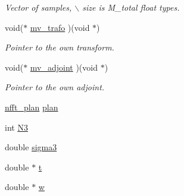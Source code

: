 \begin{CompactItemize}
\begin{CompactList}\small\item\em Vector of samples, $\backslash$ size is M\_\-total float types. \item\end{CompactList}\item 
\hypertarget{structmri__inh__3d__plan_780818802d5bfdc4d4174a3637254fd5}{
void($\ast$ \hyperlink{structmri__inh__3d__plan_780818802d5bfdc4d4174a3637254fd5}{mv\_\-trafo} )(void $\ast$)}
\label{structmri__inh__3d__plan_780818802d5bfdc4d4174a3637254fd5}

\begin{CompactList}\small\item\em Pointer to the own transform. \item\end{CompactList}\item 
\hypertarget{structmri__inh__3d__plan_fa2e143e704b701e9a0ee1d795f46b5b}{
void($\ast$ \hyperlink{structmri__inh__3d__plan_fa2e143e704b701e9a0ee1d795f46b5b}{mv\_\-adjoint} )(void $\ast$)}
\label{structmri__inh__3d__plan_fa2e143e704b701e9a0ee1d795f46b5b}

\begin{CompactList}\small\item\em Pointer to the own adjoint. \item\end{CompactList}\item 
\hypertarget{structmri__inh__3d__plan_c8386842f48b212c4132a3b151d73402}{
\hyperlink{structnfft__plan}{nfft\_\-plan} \hyperlink{structmri__inh__3d__plan_c8386842f48b212c4132a3b151d73402}{plan}}
\label{structmri__inh__3d__plan_c8386842f48b212c4132a3b151d73402}

\item 
\hypertarget{structmri__inh__3d__plan_f12a214bc2e75f1188cd7ff1bb99f0ff}{
int \hyperlink{structmri__inh__3d__plan_f12a214bc2e75f1188cd7ff1bb99f0ff}{N3}}
\label{structmri__inh__3d__plan_f12a214bc2e75f1188cd7ff1bb99f0ff}

\item 
\hypertarget{structmri__inh__3d__plan_88b160a5bf9943ebffc65365f2b7663f}{
double \hyperlink{structmri__inh__3d__plan_88b160a5bf9943ebffc65365f2b7663f}{sigma3}}
\label{structmri__inh__3d__plan_88b160a5bf9943ebffc65365f2b7663f}

\item 
\hypertarget{structmri__inh__3d__plan_e7fe0fd3fb4509abc5a7a7c07df63a1b}{
double $\ast$ \hyperlink{structmri__inh__3d__plan_e7fe0fd3fb4509abc5a7a7c07df63a1b}{t}}
\label{structmri__inh__3d__plan_e7fe0fd3fb4509abc5a7a7c07df63a1b}

\item 
\hypertarget{structmri__inh__3d__plan_af6f68ab1fa5e3b852487bf12dc483ff}{
double $\ast$ \hyperlink{structmri__inh__3d__plan_af6f68ab1fa5e3b852487bf12dc483ff}{w}}
\label{structmri__inh__3d__plan_af6f68ab1fa5e3b852487bf12dc483ff}

\end{CompactItemize}


